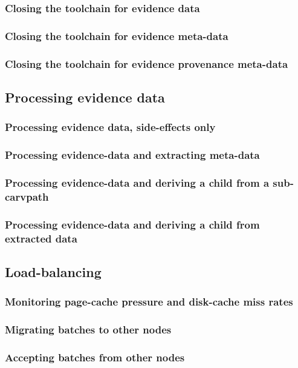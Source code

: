 \subsubsection{Closing the toolchain for evidence data}
\subsubsection{Closing the toolchain for evidence meta-data}
\subsubsection{Closing the toolchain for evidence provenance meta-data}
\subsection{Processing evidence data}
\subsubsection{Processing evidence data, side-effects only}
\subsubsection{Processing evidence-data and extracting meta-data}
\subsubsection{Processing evidence-data and deriving a child from a sub-carvpath}
\subsubsection{Processing evidence-data and deriving a child from extracted data}
\subsection{Load-balancing}
\subsubsection{Monitoring page-cache pressure and disk-cache miss rates} 
\subsubsection{Migrating batches to other nodes}
\subsubsection{Accepting batches from other nodes}
